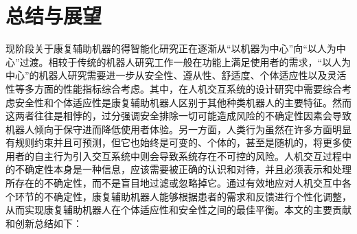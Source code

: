 \chapter{总结与展望}
现阶段关于康复辅助机器的得智能化研究正在逐渐从``以机器为中心''向``以人为中心''过渡。相较于传统的机器人研究工作一般在功能上满足使用者的需求，``以人为中心''的机器人研究需要进一步从安全性、遵从性、舒适度、个体适应性以及灵活性等多方面的性能指标综合考虑。其中，在人机交互系统的设计研究中需要综合考虑安全性和个体适应性是康复辅助机器人区别于其他种类机器人的主要特征。然而这两者往往是相悖的，过分强调安全排除一切可能造成风险的不确定性因素会导致机器人倾向于保守进而降低使用者体验。另一方面，人类行为虽然在许多方面明显有规则约束并且可预测，但它也始终是可变的、个体的，甚至是随机的，将更多使用者的自主行为引入交互系统中则会导致系统存在不可控的风险。人机交互过程中的不确定性本身是一种信息，应该需要被正确的认识和对待，并且必须表示和处理所存在的不确定性，而不是盲目地过滤或忽略掉它。通过有效地应对人机交互中各个环节的不确定性，康复辅助机器人能够根据患者的需求和反馈进行个性化调整，从而实现康复辅助机器人在个体适应性和安全性之间的最佳平衡。本文的主要贡献和创新总结如下：

